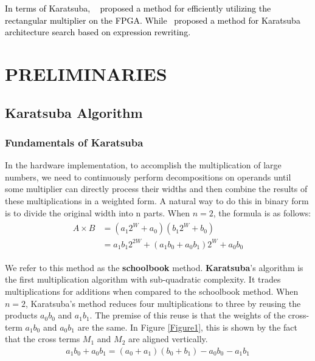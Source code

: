 \documentclass[conference]{IEEEtran}
\begin{document}
\textcolor{black}{
In terms of Karatsuba, ~\cite{Karatsuba_with_Rectangular_Multipliers_for_FPGAs} proposed a method for efficiently utilizing the rectangular multiplier on the FPGA. While~\cite{IMpress_Large_Integer_Multiplication_Expression_Rewriting_for_FPGA_HLS} proposed a method for Karatsuba architecture search based on expression rewriting.
}


\section{PRELIMINARIES}

\subsection{Karatsuba Algorithm}

\subsubsection{Fundamentals of Karatsuba}

In the hardware implementation, to accomplish the multiplication of large numbers, we need to continuously perform decompositions on operands until some multiplier can directly process their widths and then combine the results of these multiplications in a weighted form. A natural way to do this in binary form is to divide the original width into n parts. When $n=2$, the formula is as follows:
\begin{equation}
    \begin{split}
        \begin{aligned}A \times B &=\left(a_1 2^W+a_0\right)\left(b_1 2^W+b_0\right) \\
        &={a_1 b_1} 2^{2 W}+({a_1 b_0}+{a_0 b_1}) 2^W+{a_0 b_0}\end{aligned}
    \end{split} 
\end{equation}


We refer to this method as the \textbf{schoolbook} method. \textbf{Karatsuba}'s algorithm is the first multiplication algorithm with sub-quadratic complexity. It trades multiplications for additions when compared to the schoolbook method. When $n=2$, Karatsuba's method reduces four multiplications to three by reusing the products $a_0b_0$ and $a_1b_1$. The premise of this reuse is that the weights of the cross-term $a_1b_0$ and $a_0b_1$ are the same. In Figure \ref{Figure1}, this is shown by the fact that the cross terms $M_1$ and $M_2$ are aligned vertically.
\begin{equation}
    \begin{split}
        a_1 b_0+a_0 b_1=\left(a_0+a_1\right)\left(b_0+b_1\right)-{a_0 b_0}_{}-{a_1 b_1}_{}
    \end{split} 
\label{basic-kara}
\end{equation}
\end{document}

